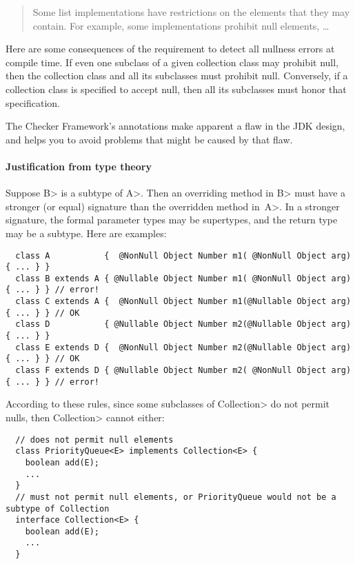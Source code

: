 \begin{quote}
  Some list implementations have restrictions on the elements that they may
  contain. For example, some implementations prohibit null elements, \ldots
\end{quote}

Here are some consequences of the requirement to detect all nullness errors
at compile time.  If even one subclass of a given collection class may
prohibit null, then the collection class and all its subclasses must
prohibit null.  Conversely, if a collection class is specified to accept
null, then all its subclasses must honor that specification.

The Checker Framework's annotations make apparent a flaw in the JDK
design, and helps you to avoid problems that might be caused by that flaw.


\paragraph{Justification from type theory\label{faq-list-map-nonnull-typeargs-junification-from-type-theory}}
Suppose \<B> is a subtype of \<A>.
Then an overriding method in \<B> must have a stronger (or equal) signature
than the overridden method in~\<A>.  In a stronger signature, the formal
parameter types may be supertypes, and the return type may be a subtype.
Here are examples:

\begin{Verbatim}
  class A           {  @NonNull Object Number m1( @NonNull Object arg) { ... } }
  class B extends A { @Nullable Object Number m1( @NonNull Object arg) { ... } } // error!
  class C extends A {  @NonNull Object Number m1(@Nullable Object arg) { ... } } // OK
  class D           { @Nullable Object Number m2(@Nullable Object arg) { ... } }
  class E extends D {  @NonNull Object Number m2(@Nullable Object arg) { ... } } // OK
  class F extends D { @Nullable Object Number m2( @NonNull Object arg) { ... } } // error!
\end{Verbatim}

According to these rules, since some subclasses of \<Collection> do not
permit nulls, then \<Collection> cannot either:

\begin{Verbatim}
  // does not permit null elements
  class PriorityQueue<E> implements Collection<E> {
    boolean add(E);
    ...
  }
  // must not permit null elements, or PriorityQueue would not be a subtype of Collection
  interface Collection<E> {
    boolean add(E);
    ...
  }
\end{Verbatim}


